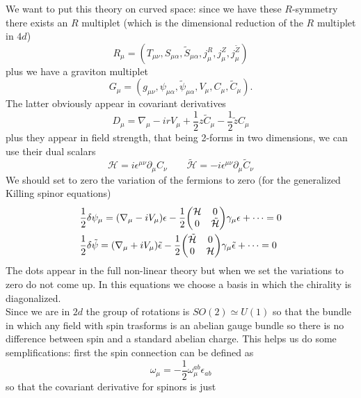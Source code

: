 \documentclass[11pt]{article}
\theoremstyle{definition}
\numberwithin{equation}{section}
\begin{document}
We want to put this theory on curved space: since we have these $R$-symmetry there exists an $R$ multiplet (which is the dimensional reduction of the $R$ multiplet in $4d$)
\begin{equation}
	R_{\mu} = (T_{\mu\nu},S_{\mu\alpha},\tilde{S}_{\mu\alpha},j^{R}_{\mu},j^{Z}_{\mu},j^{\tilde{Z}}_{\mu})
\end{equation}
plus we have a graviton multiplet
\begin{equation}
	G_{\mu} = (g_{\mu\nu},\psi_{\mu\alpha},\tilde{\psi}_{\mu\alpha},V_{\mu},C_{\mu},\tilde{C}_{\mu}).
\end{equation}
The latter obviously appear in covariant derivatives
\begin{equation}
	D_{\mu} = \nabla_{\mu} -irV_{\mu}+\frac{1}{2}z \tilde{C}_{\mu}-\frac{1}{2}\tilde{z}C_{\mu}
\end{equation}
plus they appear in field strength, that being 2-forms in two dimensions, we can use their dual scalars
\begin{equation}
	\mathcal{H} = i\epsilon^{\mu\nu}\partial_{\mu}C_{\nu}\qquad\tilde{\mathcal{H}} = -i\epsilon^{\mu\nu}\partial_{\mu}\tilde{C}_{\nu} 
\end{equation}
We should set to zero the variation of the fermions to zero (for the generalized Killing spinor equations)
\begin{align}
	&\frac{1}{2}\delta\psi_{\mu} = (\nabla_{\mu}-iV_{\mu})\epsilon - \frac{1}{2}\mqty(\mathcal{H}&0\\0&\tilde{\mathcal{H}})\gamma_{\mu}\epsilon+\cdots=0\\
	&\frac{1}{2}\delta\tilde{\psi}=(\nabla_{\mu}+iV_{\mu})\tilde\epsilon - \frac{1}{2}\mqty(\tilde{\mathcal{H}}&0\\0&\mathcal{H})\gamma_{\mu}\tilde\epsilon+\cdots=0
\end{align}
The dots appear in the full non-linear theory but when we set the variations to zero do not come up. In this equations we choose a basis in which the chirality is diagonalized.\\
Since we are in $2d$ the group of rotations is $SO(2)\simeq U(1)$ so that the bundle in which any field with spin trasforms is an abelian gauge bundle so there is no difference between spin and a standard abelian charge. This helps us do some semplifications: first the spin connection can be defined as
\begin{equation}
	\omega_{\mu}=-\frac{1}{2}\omega_{\mu}^{ab}\epsilon_{ab}
\end{equation}
so that the covariant derivative for spinors is just
\end{document}
